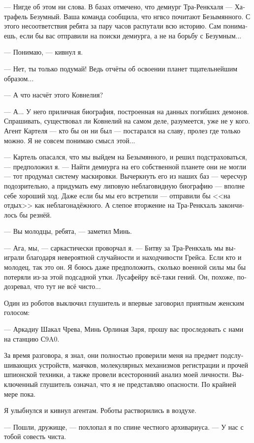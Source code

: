 \documentclass[a4paper,12pt,fleqn]{book}\usepackage{cooltooltips}\usepackage{polyglossia}\setdefaultlanguage[babelshorthands=true]{russian}\setotherlanguage{english}\defaultfontfeatures{Ligatures=TeX,Mapping=tex-text} \usepackage{xcolor}\definecolor{lightgray}{HTML}{bbbbbb}\color{lightgray}\newcommand{\ml}[3]{\textenglish{\textcolor{black}{#3}}}
\begin{document}
{--- Нигде об этом ни слова. В базах отмечено, что демиург Тра-Ренкхаля --- Хатрафель Безумный.
Ваша команда сообщила, что нгвсо почитают Безымянного.
С этого несоответствия ребята за пару часов распутали всю историю.
Сам понимаешь, если бы вас отправили на поиски демиурга, а не на борьбу с Безумным...

--- Понимаю, --- кивнул я.

--- Нет, ты только подумай!
Ведь отчёты об освоении планет тщательнейшим образом...

--- А что насчёт этого Ковнелия?

--- А...
У него приличная биография, построенная на данных погибших демонов.
Спрашивать, существовал ли Ковнелий на самом деле, разумеется, уже не у кого.
Агент Картеля --- кто бы он ни был --- постарался на славу, пролез где только можно.
Я не совсем понимаю смысл этой...

--- Картель опасался, что мы выйдем на Безымянного, и решил подстраховаться, --- предположил я.
--- Найти демиурга на его собственной планете они не могли --- тот продумал систему маскировки.
Вычеркнуть его из наших баз --- чересчур подозрительно, а придумать ему липовую неблаговидную биографию --- вполне себе хороший ход.
Даже если бы мы его встретили --- отправили бы <<на отдых>> как неблагонадёжного.
А слепое вторжение на Тра-Ренкхаль закончилось бы резнёй.

--- Вы молодцы, ребята, --- заметил Минь.

--- Ага, мы, --- саркастически проворчал я.
--- Битву за Тра-Ренкхаль мы выиграли благодаря невероятной случайности и находчивости Грейса.
Если кто и молодец, так это он.
Я боюсь даже предположить, сколько военной силы мы бы потеряли из-за этой подсадной утки.
Лусафейру всё-таки гений.
Он, похоже, подозревал, что тут не всё чисто...

Один из роботов выключил глушитель и впервые заговорил приятным женским голосом:

--- Аркадиу Шакал Чрева, Минь Орлиная Заря, прошу вас проследовать с нами на станцию С9A0.

За время разговора, я знал, они полностью проверили меня на предмет подслушивающих устройств, маячков, молекулярных механизмов регистрации и прочей шпионской техники, а также провели всесторонний анализ моей личности.
Выключенный глушитель означал, что я не представляю опасности.
По крайней мере пока.

Я улыбнулся и кивнул агентам.
Роботы растворились в воздухе.

--- Пошли, дружище, --- похлопал я по спине честного архивариуса.
--- У нас с тобой совесть чиста.

}
\end{document}
